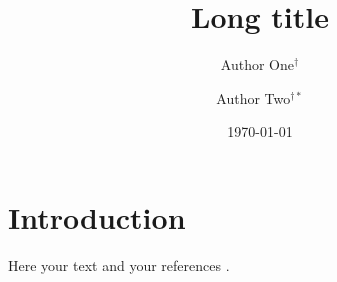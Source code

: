 \documentclass[oneside, reqno, 11pt, a4paper]{amsart}
\title[Short title]{Long title}
\date{\today}
\author[A. One]{Author One$^\dagger$}
\author[A. Two]{Author Two$^{\dagger\ast}$}
\begin{document}
\begin{abstract}
\end{abstract}

\maketitle

\section{Introduction}
\label{Sec:introduction}
% 

Here your text and your references \cite{2106.13728,2102.11802,10.21105_joss.02520,10.1016_0021-9991_80_90005-4}.

\printbibliography


\end{document}

